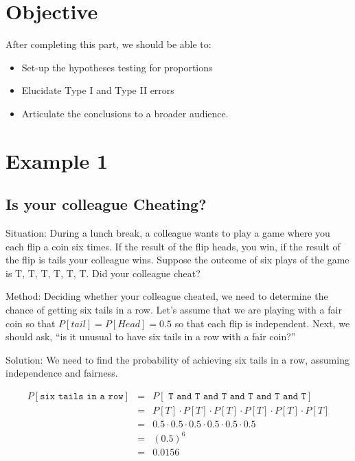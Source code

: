 \documentclass[11pt, chapterprefix=true]{scrbook}\usepackage[]{graphicx}\usepackage[]{color}
\begin{document}
\section{Objective}

After completing this part, we should be able to:

\vspace{1mm}

{\parbox{14cm}{

\begin{itemize}
\item Set-up the hypotheses testing for proportions
\item Elucidate Type I and Type II errors
\item Articulate the conclusions to a broader audience. 
\end{itemize}
 }}

\section{Example 1}

\subsection{Is your colleague Cheating?}

Situation: During a lunch break, a colleague wants to play a game where you each flip a coin six times.  If the result of the flip heads, you win, if the result of the flip is tails your colleague wins.  Suppose the outcome of six plays of the game is T, T, T, T, T, T.  Did your colleague cheat?

Method: Deciding whether your colleague cheated, we need to determine the chance of getting six tails in a row. Let's assume that we are playing with a fair coin so that $P[tail] = P[Head] = 0.5$ so that each flip is independent.  Next, we should ask, ``is it unusual to have six tails in a row with a fair coin?''

Solution: We need to find the probability of achieving six tails in a row, assuming independence and fairness.

\begin{eqnarray*}
P[\texttt{six tails in a row}] &=& P[\texttt{ T and T and T and T and T and T} ] \\
&=& P[T] \cdot P[T] \cdot P[T] \cdot P[T] \cdot P[T] \cdot P[T] \\
&=& 0.5 \cdot 0.5 \cdot 0.5 \cdot 0.5 \cdot 0.5 \cdot 0.5 \\
&=& (0.5)^6 \\
&=& 0.0156
\end{eqnarray*}
\end{document}
